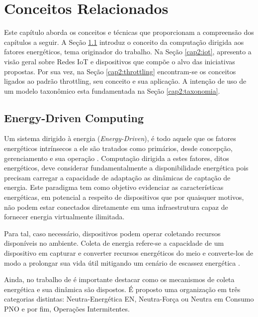 \chapter{Conceitos Relacionados}
\label{cap:cap2}

Este capítulo aborda os conceitos e técnicas que proporcionam a compreensão dos capítulos a seguir. A Seção \ref{cap2:energyDriven} introduz o conceito da computação dirigida aos fatores energéticos, tema originador do trabalho. Na Seção \ref{cap2:iot}, apresento a visão geral sobre Redes IoT e dispositivos que compõe o alvo das iniciativas propostas. Por sua vez, na Seção \ref{cap2:throttling} encontram-se os conceitos ligados ao padrão throttling, seu conceito e sua aplicação. A intenção de uso de um modelo taxonômico esta fundamentada na Seção \ref{cap2:taxonomia}.

\section{Energy-Driven Computing}
\label{cap2:energyDriven}

Um sistema dirigido à energia (\textit{Energy-Driven}), é todo aquele que os fatores energéticos intrínsecos a ele são tratados como primários, desde concepção, gerenciamento e sua operação \cite{merrett_energy-driven_2017}. Computação dirigida a estes fatores, ditos energéticos, deve considerar fundamentalmente a disponibilidade energética pois precisam carregar a capacidade de adaptação as dinâmicas de captação de energia. Este paradigma tem como objetivo evidenciar as características energéticas, em potencial a respeito de dispositivos que por quaisquer motivos, não podem estar conectados diretamente em uma infraestrutura capaz de fornecer energia virtualmente ilimitada. 

Para tal, caso necessário, dispositivos podem operar coletando recursos disponíveis no ambiente. Coleta de energia refere-se a capacidade de um dispositivo em capturar e converter recursos energéticos do meio e converte-los de modo a prolongar sua vida útil mitigando um cenário de escassez energética \cite{sudevalayam_energy_2011}. 

Ainda, no trabalho de \cite{sliper_energy-driven_2020} é importante destacar como os mecanismos de coleta energética e sua dinâmica são dispostos. É proposto uma organização em três categorias distintas: Neutra-Energética \ac{EN}, Neutra-Força ou Neutra em Consumo \ac{PNO} e por fim, Operações Intermitentes.


